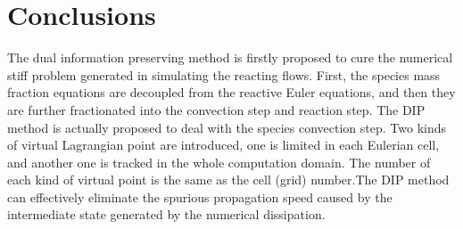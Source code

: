 \documentclass[review]{elsarticle}
\theoremstyle{plain}\newtheorem{definition}{\sc{Definition}}
\theoremstyle{defination}\newtheorem{example}{Example}[section]
\numberwithin{equation}{section}
\numberwithin{table}{section}
\begin{document}
{%
%
%
\section{Conclusions}

The dual information preserving method is firstly proposed to cure the numerical stiff problem generated in simulating the reacting flows. First, the species mass fraction equations are decoupled from the reactive Euler equations, and then they are further fractionated into the convection step and reaction step. The DIP method is actually proposed to deal with the species convection step. Two kinds of virtual Lagrangian point are introduced, one is limited in each Eulerian cell, and another one is tracked in the whole computation domain. The number of each kind of virtual point is the same as the cell (grid) number.The DIP method can effectively eliminate the spurious propagation speed caused by the intermediate state generated by the numerical dissipation.

}
\end{document}
